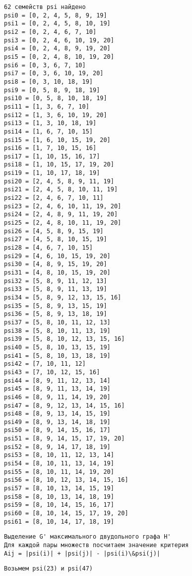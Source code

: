 \documentclass[11pt]{article}
\begin{document}
    \begin{Verbatim}[commandchars=\\\{\}]
62 семейств psi найдено
psi0 = [0, 2, 4, 5, 8, 9, 19]
psi1 = [0, 2, 4, 5, 8, 10, 19]
psi2 = [0, 2, 4, 6, 7, 10]
psi3 = [0, 2, 4, 6, 10, 19, 20]
psi4 = [0, 2, 4, 8, 9, 19, 20]
psi5 = [0, 2, 4, 8, 10, 19, 20]
psi6 = [0, 3, 6, 7, 10]
psi7 = [0, 3, 6, 10, 19, 20]
psi8 = [0, 3, 10, 18, 19]
psi9 = [0, 5, 8, 9, 18, 19]
psi10 = [0, 5, 8, 10, 18, 19]
psi11 = [1, 3, 6, 7, 10]
psi12 = [1, 3, 6, 10, 19, 20]
psi13 = [1, 3, 10, 18, 19]
psi14 = [1, 6, 7, 10, 15]
psi15 = [1, 6, 10, 15, 19, 20]
psi16 = [1, 7, 10, 15, 16]
psi17 = [1, 10, 15, 16, 17]
psi18 = [1, 10, 15, 17, 19, 20]
psi19 = [1, 10, 17, 18, 19]
psi20 = [2, 4, 5, 8, 9, 11, 19]
psi21 = [2, 4, 5, 8, 10, 11, 19]
psi22 = [2, 4, 6, 7, 10, 11]
psi23 = [2, 4, 6, 10, 11, 19, 20]
psi24 = [2, 4, 8, 9, 11, 19, 20]
psi25 = [2, 4, 8, 10, 11, 19, 20]
psi26 = [4, 5, 8, 9, 15, 19]
psi27 = [4, 5, 8, 10, 15, 19]
psi28 = [4, 6, 7, 10, 15]
psi29 = [4, 6, 10, 15, 19, 20]
psi30 = [4, 8, 9, 15, 19, 20]
psi31 = [4, 8, 10, 15, 19, 20]
psi32 = [5, 8, 9, 11, 12, 13]
psi33 = [5, 8, 9, 11, 13, 19]
psi34 = [5, 8, 9, 12, 13, 15, 16]
psi35 = [5, 8, 9, 13, 15, 19]
psi36 = [5, 8, 9, 13, 18, 19]
psi37 = [5, 8, 10, 11, 12, 13]
psi38 = [5, 8, 10, 11, 13, 19]
psi39 = [5, 8, 10, 12, 13, 15, 16]
psi40 = [5, 8, 10, 13, 15, 19]
psi41 = [5, 8, 10, 13, 18, 19]
psi42 = [7, 10, 11, 12]
psi43 = [7, 10, 12, 15, 16]
psi44 = [8, 9, 11, 12, 13, 14]
psi45 = [8, 9, 11, 13, 14, 19]
psi46 = [8, 9, 11, 14, 19, 20]
psi47 = [8, 9, 12, 13, 14, 15, 16]
psi48 = [8, 9, 13, 14, 15, 19]
psi49 = [8, 9, 13, 14, 18, 19]
psi50 = [8, 9, 14, 15, 16, 17]
psi51 = [8, 9, 14, 15, 17, 19, 20]
psi52 = [8, 9, 14, 17, 18, 19]
psi53 = [8, 10, 11, 12, 13, 14]
psi54 = [8, 10, 11, 13, 14, 19]
psi55 = [8, 10, 11, 14, 19, 20]
psi56 = [8, 10, 12, 13, 14, 15, 16]
psi57 = [8, 10, 13, 14, 15, 19]
psi58 = [8, 10, 13, 14, 18, 19]
psi59 = [8, 10, 14, 15, 16, 17]
psi60 = [8, 10, 14, 15, 17, 19, 20]
psi61 = [8, 10, 14, 17, 18, 19]
    \end{Verbatim}

    \begin{Verbatim}[commandchars=\\\{\}]
Выделение G' максимального двудольного графа H'
Для каждой пары множеств посчитаем значение критерия
Aij = |psi(i)| + |psi(j)| - |psi(i)\&psi(j)|
    \end{Verbatim}

    \begin{Verbatim}[commandchars=\\\{\}]
Возьмем psi(23) и psi(47)
    \end{Verbatim}
\end{document}
